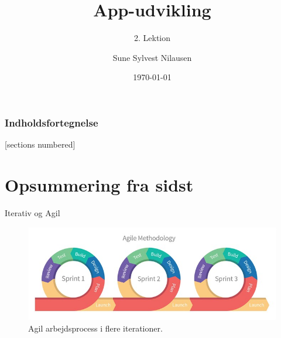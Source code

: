 \documentclass[10pt]{beamer}
\title{App-udvikling}
\subtitle{2. Lektion}
\date{\today}
\author{Sune Sylvest Nilausen}
\begin{document}

\maketitle

\begin{frame}
  \frametitle{Indholdsfortegnelse}
  [sections numbered]
  \tableofcontents[hideallsubsections]
\end{frame}

\section{Opsummering fra sidst}

\begin{frame}{Iterativ og Agil}
\begin{figure}	
		\centering
		\includegraphics[width=\linewidth]{img/sprints.jpg}
		\caption{Agil arbejdsprocess i flere iterationer.}
	\end{figure}
\end{frame}
\end{document}
